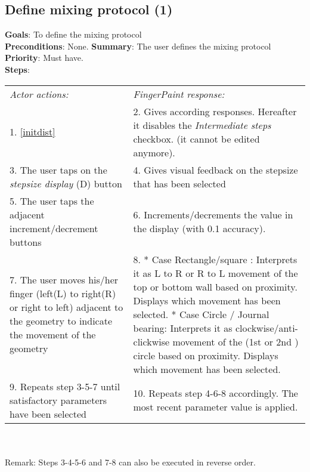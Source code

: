 \begin{appendices}
  \section{Define mixing protocol (1)}
  \label{mixprot1}
  \textbf{Goals}: To define the mixing protocol\\
  \textbf{Preconditions}: None. %
  \textbf{Summary}: The user defines the mixing protocol\\
  \textbf{Priority}: Must have.\\
  \textbf{Steps}: \\
  \begin{tabular}{ p{} p{} }
  	\emph{Actor actions:} & \emph{FingerPaint response:} \\
    1. \ref{initdist} & 2. Gives according responses. Hereafter it disables the \emph{Intermediate steps} checkbox. (it cannot be edited anymore). \\
    3. The user taps on the \emph{stepsize display} (D) button & 4.	Gives visual feedback on the stepsize that has been selected\\
    5. The user taps the adjacent increment/decrement buttons & 6.	Increments/decrements the value in the display (with 0.1 accuracy). \\
    7. The user moves his/her finger (left(L) to right(R) or right to left) adjacent to the geometry to indicate the movement of the geometry & 8.	* Case Rectangle/square : Interprets it as L to R or R to L movement of the top or bottom wall based on proximity. Displays which movement has been selected. * Case Circle / Journal bearing: Interprets it as clockwise/anti-clickwise movement of the (1st or 2nd ) circle based on proximity. Displays which movement has been selected.\\
    9.	Repeats step 3-5-7 until satisfactory parameters have been selected & 10. Repeats step 4-6-8 accordingly. The most recent parameter value is applied.\\
  \end{tabular}
  \\
\\Remark: Steps 3-4-5-6 and 7-8 can also be executed in reverse order.


\end{appendices}
